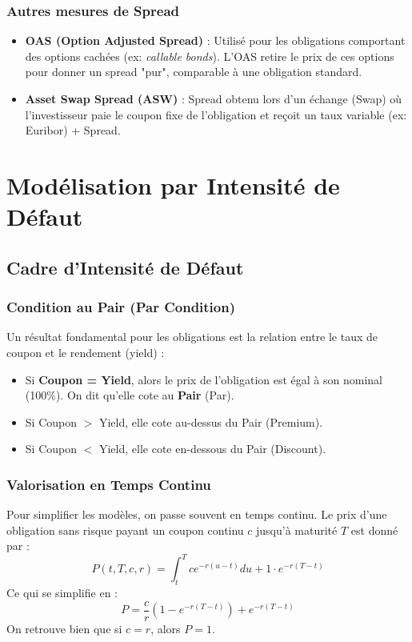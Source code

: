 \subsubsection{Autres mesures de Spread}

\begin{itemize}
    \item \textbf{OAS (Option Adjusted Spread)} : Utilisé pour les obligations comportant des options cachées (ex: \textit{callable bonds}). L'OAS retire le prix de ces options pour donner un spread "pur", comparable à une obligation standard.
    \item \textbf{Asset Swap Spread (ASW)} : Spread obtenu lors d'un échange (Swap) où l'investisseur paie le coupon fixe de l'obligation et reçoit un taux variable (ex: Euribor) + Spread.
\end{itemize}

\section{Modélisation par Intensité de Défaut}

\subsection{Cadre d'Intensité de Défaut}

\subsubsection{Condition au Pair (Par Condition)}

Un résultat fondamental pour les obligations est la relation entre le taux de coupon et le rendement (yield) :
\begin{itemize}
    \item Si \textbf{Coupon = Yield}, alors le prix de l'obligation est égal à son nominal (100\%). On dit qu'elle cote au \textbf{Pair} (Par).
    \item Si Coupon $>$ Yield, elle cote au-dessus du Pair (Premium).
    \item Si Coupon $<$ Yield, elle cote en-dessous du Pair (Discount).
\end{itemize}

\subsubsection{Valorisation en Temps Continu}

Pour simplifier les modèles, on passe souvent en temps continu. Le prix d'une obligation sans risque payant un coupon continu $c$ jusqu'à maturité $T$ est donné par :
\begin{equation}
    P(t, T, c, r) = \int_t^T c e^{-r(u-t)} du + 1 \cdot e^{-r(T-t)}
\end{equation}
Ce qui se simplifie en :
\begin{equation}
    P = \frac{c}{r} (1 - e^{-r(T-t)}) + e^{-r(T-t)}
\end{equation}
On retrouve bien que si $c=r$, alors $P=1$.

